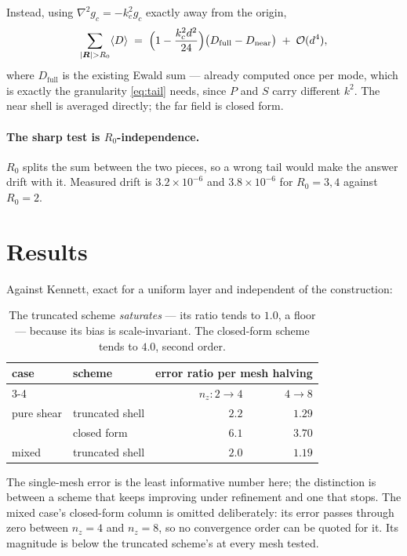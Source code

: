 \documentclass[11pt,a4paper]{article}
\newcommand{\order}{\mathcal{O}}
\newcommand{\avg}[1]{\langle #1 \rangle}
\begin{document}
Instead, using $\nabla^{2}g_c = -k_c^{2}g_c$ exactly away from the origin,
%
\begin{equation}
  \sum_{|\bm{R}|>R_0} \avg{D} \;=\;
  \Bigl(1 - \frac{k_c^{2}d^{2}}{24}\Bigr)\bigl(D_{\text{full}} - D_{\text{near}}\bigr)
  \;+\; \order(d^{4}),
  \label{eq:tail}
\end{equation}
%
where $D_{\text{full}}$ is the existing Ewald sum --- already computed once per
mode, which is exactly the granularity \eqref{eq:tail} needs, since $P$ and $S$
carry different $k^{2}$. The near shell is averaged directly; the far field is
closed form.

\paragraph{The sharp test is $R_0$-independence.} $R_0$ splits the sum between
the two pieces, so a wrong tail would make the answer drift with it. Measured
drift is $3.2\times10^{-6}$ and $3.8\times10^{-6}$ for $R_0=3,4$ against $R_0=2$.

\section{Results}

Against Kennett, exact for a uniform layer and independent of the construction:

\begin{table}[h]
\centering
\begin{tabular}{llrr}
\toprule
case & scheme & \multicolumn{2}{c}{error ratio per mesh halving}\\
\cmidrule(lr){3-4}
 & & $n_z\!:\!2\to4$ & $4\to8$ \\
\midrule
pure shear & truncated shell & $2.2$ & $1.29$\\
           & closed form     & $6.1$ & $3.70$\\
mixed      & truncated shell & $2.0$ & $1.19$\\
\bottomrule
\end{tabular}
\caption{The truncated scheme \emph{saturates} --- its ratio tends to $1.0$,
a floor --- because its bias is scale-invariant. The closed-form scheme tends
to $4.0$, second order.}
\end{table}

The single-mesh error is the least informative number here; the distinction is
between a scheme that keeps improving under refinement and one that stops. The
mixed case's closed-form column is omitted deliberately: its error passes
through zero between $n_z=4$ and $n_z=8$, so no convergence order can be quoted
for it. Its magnitude is below the truncated scheme's at every mesh tested.
\end{document}

